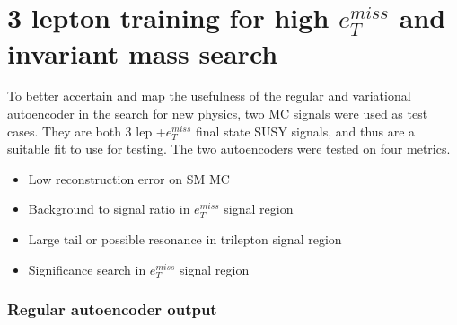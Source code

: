 
\section{3 lepton training for high $e_T^{miss}$ and invariant mass search}\label{sec:3lep}


To better accertain and map the usefulness of the regular and variational autoencoder in the search for 
new physics, two MC signals were used as test cases. They are both 3 lep +$e_T^{miss}$ final state SUSY signals,
and thus are a suitable fit to use for testing. The two autoencoders were tested on four metrics. 
\begin{itemize}
    \item Low reconstruction error on SM MC
    \item Background to signal ratio in $e_T^{miss}$ signal region
    \item Large tail or possible resonance in trilepton signal region
    \item Significance search in $e_T^{miss}$ signal region
\end{itemize}



\subsubsection*{Regular autoencoder output}


